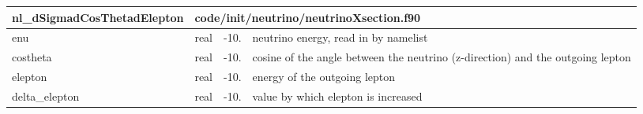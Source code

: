 \documentclass{article}
\begin{document}

\begin{longtable}{llll}
\toprule
\textbf{\large{nl\_dSigmadCosThetadElepton}} & \multicolumn{3}{l}{\footnotesize{code/init/neutrino/neutrinoXsection.f90}}\\*
\midrule
\endfirsthead
\midrule
\endhead
enu & \begin{minipage}[t]{2cm}real\end{minipage} & \begin{minipage}[t]{2cm}-10.\end{minipage} & \begin{minipage}[t]{12cm}neutrino energy, read in by namelist\end{minipage}\\*
\midrule
costheta & \begin{minipage}[t]{2cm}real\end{minipage} & \begin{minipage}[t]{2cm}-10.\end{minipage} & \begin{minipage}[t]{12cm}cosine of the angle between the neutrino (z-direction) and the outgoing lepton\end{minipage}\\*
\midrule
elepton & \begin{minipage}[t]{2cm}real\end{minipage} & \begin{minipage}[t]{2cm}-10.\end{minipage} & \begin{minipage}[t]{12cm}energy of the outgoing lepton\end{minipage}\\*
\midrule
delta\_elepton & \begin{minipage}[t]{2cm}real\end{minipage} & \begin{minipage}[t]{2cm}-10.\end{minipage} & \begin{minipage}[t]{12cm}value by which elepton is increased\end{minipage}\\*
\bottomrule
\end{longtable}
{ }



\end{document}
